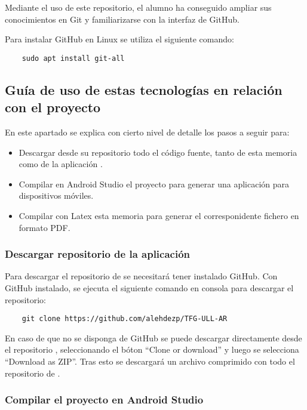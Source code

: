Mediante el uso de este repositorio, el alumno ha conseguido ampliar sus conocimientos en Git y familiarizarse con la interfaz de GitHub.

Para instalar GitHub en Linux se utiliza el siguiente comando:
\begin{lstlisting}
    sudo apt install git-all
\end{lstlisting}

\subsection{Guía de uso de estas tecnologías en relación con el proyecto \ULLAR{}}
En este apartado se explica con cierto nivel de detalle los pasos a seguir para:
\begin{itemize}
\item Descargar desde su repositorio todo el código fuente, tanto de esta memoria como de la aplicación \ULLAR{}.
\item Compilar en Android Studio el proyecto \ULLAR{} para generar una aplicación para dispositivos móviles.
\item Compilar con Latex esta memoria para generar el corresponidente fichero en formato PDF.
\end{itemize}

\subsubsection{Descargar repositorio de la aplicación}

Para descargar el repositorio de \ULLAR{} se necesitará tener instalado GitHub. Con GitHub instalado, se ejecuta el siguiente comando en consola para descargar el repositorio:

\begin{lstlisting}
    git clone https://github.com/alehdezp/TFG-ULL-AR 
\end{lstlisting}

En caso de que no se disponga de GitHub se puede descargar directamente desde el repositorio \cite{URL::repositorioAplicacion}, seleccionando el bóton ``Clone or download'' y luego se selecciona ``Download as ZIP''. Tras esto se descargará un archivo comprimido con todo el repositorio de \ULLAR{}.


\subsubsection{Compilar el proyecto en Android Studio}

